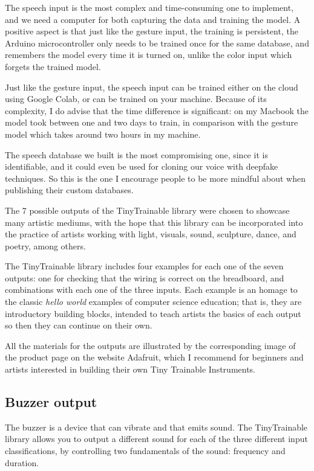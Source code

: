 The speech input is the most complex and time-consuming one to implement, and we need a computer for both capturing the data and training the model. A positive aspect is that just like the gesture input, the training is persistent, the Arduino microcontroller only needs to be trained once for the same database, and remembers the model every time it is turned on, unlike the color input which forgets the trained model.

Just like the gesture input, the speech input can be trained either on the cloud using Google Colab, or can be trained on your machine. Because of its complexity, I do advise that the time difference is significant: on my Macbook the model took between one and two days to train, in comparison with the gesture model which takes around two hours in my machine.

The speech database we built is the most compromising one, since it is identifiable, and it could even be used for cloning our voice with deepfake techniques. So this is the one I encourage people to be more mindful about when publishing their custom databases.

The 7 possible outputs of the TinyTrainable library were chosen to showcase many artistic mediums, with the hope that this library can be incorporated into the practice of artists working with light, visuals, sound, sculpture, dance, and poetry, among others.

The TinyTrainable library includes four examples for each one of the seven outputs: one for checking that the wiring is correct on the breadboard, and combinations with each one of the three inputs. Each example is an homage to the classic \emph{hello world} examples of computer science education; that is, they are introductory building blocks, intended to teach artists the basics of each output so then they can continue on their own.

All the materials for the outputs are illustrated by the corresponding image of the product page on the website Adafruit, which I recommend for beginners and artists interested in building their own Tiny Trainable Instruments.

\subsection{Buzzer output}

The buzzer is a device that can vibrate and that emits sound. The TinyTrainable library allows you to output a different sound for each of the three different input classifications, by controlling two fundamentals of the sound: frequency and duration.

